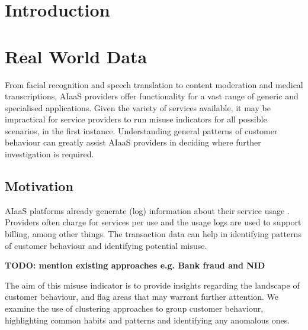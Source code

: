 \documentclass[a4paper,12pt]{report}
\begin{document}
\pagestyle{empty}
\singlespacing

\onehalfspacing

\singlespacing


\setcounter{page}{0}
\pagestyle{plain}
\tableofcontents
\listoffigures
\listoftables

\onehalfspacing


\chapter{Introduction}
\setcounter{page}{1} 

\chapter{Real World Data}
From facial recognition and speech translation to content moderation and medical transcriptions, AIaaS providers offer functionality for a vast range of generic and specialised applications. Given the variety of services available, it may be impractical for service providers to run misuse indicators for all possible scenarios, in the first instance. Understanding general patterns of customer behaviour can greatly assist AIaaS providers in deciding where further investigation is required. 

\section{Motivation}

AIaaS platforms already generate (log) information about their service usage \cite{shahrad2020serverless}. Providers often charge for services per use and the usage logs are used to support billing, among other things. The transaction data can help in identifying patterns of customer behaviour and identifying potential misuse.

\textbf{TODO: mention existing approaches e.g. Bank fraud and NID}

The aim of this misuse indicator is to provide insights regarding the landscape of customer behaviour, and flag areas that may warrant further attention. We examine the use of clustering approaches to group customer behaviour, highlighting common habits and patterns and identifying any anomalous ones. 
\end{document}
